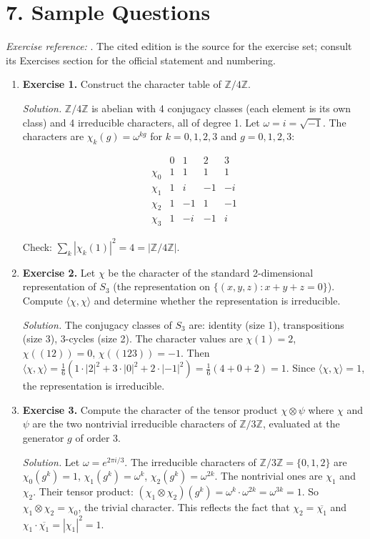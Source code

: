 \section*{7. Sample Questions}
\emph{Exercise reference:} \cite{character_theory_ref1}. The cited edition is the source for the exercise set; consult its Exercises section for the official statement and numbering.
\begin{enumerate}[leftmargin=*,itemsep=0.9em]

\item \textbf{Exercise 1.} Construct the character table of $\mathbb{Z}/4\mathbb{Z}$.

\emph{Solution.} $\mathbb{Z}/4\mathbb{Z}$ is abelian with 4 conjugacy classes (each element is its own class) and 4 irreducible characters, all of degree 1. Let $\omega=i=\sqrt{-1}$. The characters are $\chi_k(g)=\omega^{kg}$ for $k=0,1,2,3$ and $g=0,1,2,3$:

\[
\begin{array}{c|cccc}
& 0 & 1 & 2 & 3\\\hline
\chi_0 & 1 & 1 & 1 & 1\\
\chi_1 & 1 & i & -1 & -i\\
\chi_2 & 1 & -1 & 1 & -1\\
\chi_3 & 1 & -i & -1 & i
\end{array}
\]

Check: $\sum_k|\chi_k(1)|^2=4=|\mathbb{Z}/4\mathbb{Z}|$.

\item \textbf{Exercise 2.} Let $\chi$ be the character of the standard 2-dimensional representation of $S_3$ (the representation on $\{(x,y,z):x+y+z=0\}$). Compute $\langle\chi,\chi\rangle$ and determine whether the representation is irreducible.

\emph{Solution.} The conjugacy classes of $S_3$ are: identity (size 1), transpositions (size 3), 3-cycles (size 2). The character values are $\chi(1)=2$, $\chi((12))=0$, $\chi((123))=-1$. Then $\langle\chi,\chi\rangle=\frac{1}{6}(1\cdot|2|^2+3\cdot|0|^2+2\cdot|-1|^2)=\frac{1}{6}(4+0+2)=1$. Since $\langle\chi,\chi\rangle=1$, the representation is irreducible.

\item \textbf{Exercise 3.} Compute the character of the tensor product $\chi\otimes\psi$ where $\chi$ and $\psi$ are the two nontrivial irreducible characters of $\mathbb{Z}/3\mathbb{Z}$, evaluated at the generator $g$ of order 3.

\emph{Solution.} Let $\omega=e^{2\pi i/3}$. The irreducible characters of $\mathbb{Z}/3\mathbb{Z}=\{0,1,2\}$ are $\chi_0(g^k)=1$, $\chi_1(g^k)=\omega^k$, $\chi_2(g^k)=\omega^{2k}$. The nontrivial ones are $\chi_1$ and $\chi_2$. Their tensor product: $(\chi_1\otimes\chi_2)(g^k)=\omega^k\cdot\omega^{2k}=\omega^{3k}=1$. So $\chi_1\otimes\chi_2=\chi_0$, the trivial character. This reflects the fact that $\chi_2=\overline{\chi_1}$ and $\chi_1\cdot\overline{\chi_1}=|\chi_1|^2=1$.


\end{enumerate}
